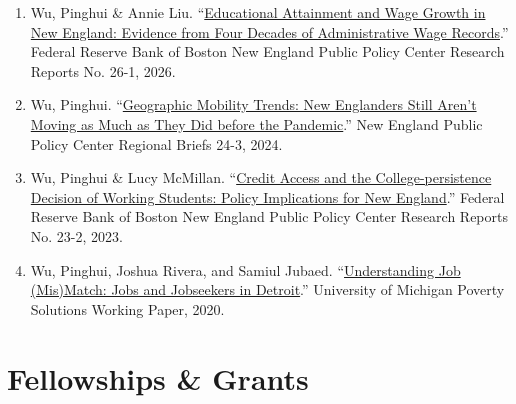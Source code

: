 \documentclass[11pt,letterpaper]{article}
\begin{document}
\begin{enumerate}[leftmargin=15pt, itemsep=6pt, parsep=0pt]
    \item Wu, Pinghui \& Annie Liu. ``\href{https://www.bostonfed.org/publications/new-england-public-policy-center-research-report/2026/educational-attainment-wage-growth-in-new-england.aspx}{Educational Attainment and Wage Growth in New England: Evidence from Four Decades of Administrative Wage Records}.'' Federal Reserve Bank of Boston New England Public Policy Center Research Reports No. 26-1, 2026.

    \item Wu, Pinghui. ``\href{https://www.bostonfed.org/publications/new-england-public-policy-center-regional-briefs/2024/geographic-mobility-trends-new-englanders-still-arent-moving-as-much-as-they-did-before-the-pandemic.aspx}{Geographic Mobility Trends: New Englanders Still Aren't Moving as Much as They Did before the Pandemic}.'' New England Public Policy Center Regional Briefs 24-3, 2024.

    \item Wu, Pinghui \& Lucy McMillan. ``\href{https://www.bostonfed.org/publications/new-england-public-policy-center-research-report/2023/credit-access-and-the-college-persistence-decision-of-working-students.aspx}{Credit Access and the College-persistence Decision of Working Students: Policy Implications for New England}.'' Federal Reserve Bank of Boston New England Public Policy Center Research Reports No. 23-2, 2023.

    \item Wu, Pinghui, Joshua Rivera, and Samiul Jubaed. ``\href{https://poverty.umich.edu/files/2020/08/Jobs-and-Jobseekers-in-Detroit-August2020-1.pdf}{Understanding Job (Mis)Match: Jobs and Jobseekers in Detroit}.'' University of Michigan Poverty Solutions Working Paper, 2020.
\end{enumerate}

\section*{Fellowships \& Grants}
\end{document}
